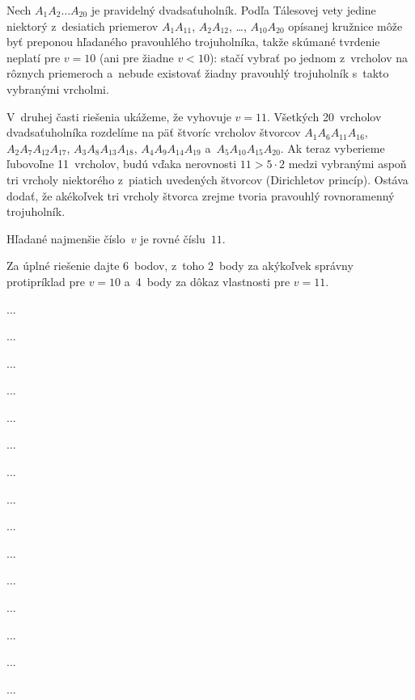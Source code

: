 {%
Nech $A_1A_2\dots A_{20}$ je pravidelný dvadsaťuholník. Podľa Tálesovej
vety jedine niektorý z~desiatich priemerov $A_1A_{11}$, $A_2A_{12}$, \dots,
$A_{10}A_{20}$ opísanej kružnice môže byť preponou hľadaného pravouhlého
trojuholníka, takže skúmané tvrdenie neplatí pre $v=10$ (ani pre žiadne
$v<10$): stačí vybrať po jednom z~vrcholov na rôznych priemeroch a~nebude
existovať žiadny pravouhlý trojuholník s~takto vybranými vrcholmi.

V~druhej časti riešenia ukážeme, že vyhovuje $v=11$. Všetkých 20~vrcholov
dvadsaťuholníka rozdelíme na päť štvoríc vrcholov štvorcov
$A_{1}A_{6}A_{11}A_{16}$, $A_{2}A_{7}A_{12}A_{17}$,
$A_{3}A_{8}A_{13}A_{18}$, $A_{4}A_{9}A_{14}A_{19}$
a~$A_{5}A_{10}A_{15}A_{20}$. Ak teraz vyberieme ľubovoľne 11~vrcholov,
budú vďaka nerovnosti $11>5\cdot2$ medzi vybranými aspoň tri vrcholy
niektorého z~piatich uvedených štvorcov (Dirichletov princíp). Ostáva
dodať, že akékoľvek tri vrcholy štvorca zrejme tvoria
pravouhlý rovnoramenný trojuholník.

\odpoved
Hľadané najmenšie číslo~$v$ je rovné číslu~$11$.


\nobreak\medskip\petit\noindent
Za úplné riešenie dajte 6~bodov, z~toho 2~body za akýkoľvek správny protipríklad
pre $v=10$ a~4~body za dôkaz vlastnosti pre $v=11$.
\endpetit}

{%
...}

{%
...}

{%
...}

{%
...}

{%
...}

{%
...}

{%
...}

{%
...}

{%
...}

{%
...}

{%
...}

{%
...}

{%
...}

{%
...}

{%
...}

